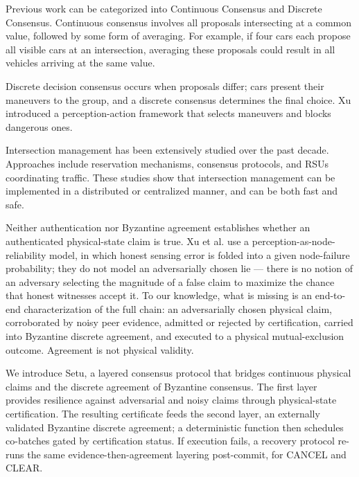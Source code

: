 \documentclass[letterpaper,10pt,conference]{IEEEtran}
\begin{document}
Previous work can be categorized into Continuous Consensus and Discrete Consensus. Continuous consensus involves all proposals intersecting at a common value, followed by some form of averaging. For example, if four cars each propose all visible cars at an intersection, averaging these proposals could result in all vehicles arriving at the same value.

Discrete decision consensus occurs when proposals differ; cars present their maneuvers to the group, and a discrete consensus determines the final choice. Xu introduced a perception-action framework that selects maneuvers and blocks dangerous ones.


Intersection management has been extensively studied over the past decade. Approaches include reservation mechanisms, consensus protocols, and RSUs coordinating traffic. These studies show that intersection management can be implemented in a distributed or centralized manner, and can be both fast and safe. 


Neither authentication nor Byzantine agreement establishes whether an authenticated physical-state claim is true. Xu et al. use a perception-as-node-reliability model, in which honest sensing error is folded into a given node-failure probability; they do not model an adversarially chosen lie — there is no notion of an adversary selecting the magnitude of a false claim to maximize the chance that honest witnesses accept it. To our knowledge, what is missing is an end-to-end characterization of the full chain: an adversarially chosen physical claim, corroborated by noisy peer evidence, admitted or rejected by certification, carried into Byzantine discrete agreement, and executed to a physical mutual-exclusion outcome. Agreement is not physical validity.

We introduce Setu, a layered consensus protocol that bridges continuous physical claims and the discrete agreement of Byzantine consensus. The first layer provides resilience against adversarial and noisy claims through physical-state certification. The resulting certificate feeds the second layer, an externally validated Byzantine discrete agreement; a deterministic function then schedules co-batches gated by certification status. If execution fails, a recovery protocol re-runs the same evidence-then-agreement layering post-commit, for CANCEL and CLEAR.
\end{document}
